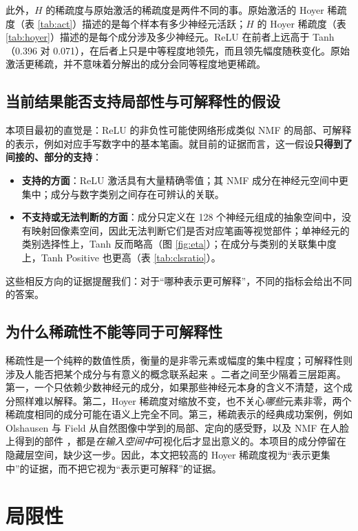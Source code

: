 \documentclass[UTF8,a4paper,11pt]{ctexart}
\begin{document}
此外，$H$ 的稀疏度与原始激活的稀疏度是两件不同的事。原始激活的 Hoyer 稀疏度（表 \ref{tab:act}）描述的是每个样本有多少神经元活跃；$H$ 的 Hoyer 稀疏度（表 \ref{tab:hoyer}）描述的是每个成分涉及多少神经元。ReLU 在前者上远高于 Tanh（0.396 对 0.071），在后者上只是中等程度地领先，而且领先幅度随秩变化。原始激活更稀疏，并不意味着分解出的成分会同等程度地更稀疏。

\subsection{当前结果能否支持局部性与可解释性的假设}

本项目最初的直觉是：ReLU 的非负性可能使网络形成类似 NMF 的局部、可解释的表示，例如对应手写数字中的基本笔画。就目前的证据而言，这一假设\textbf{只得到了间接的、部分的支持}：
\begin{itemize}
  \item \textbf{支持的方面}：ReLU 激活具有大量精确零值；其 NMF 成分在神经元空间中更集中；成分与数字类别之间存在可辨认的关联。
  \item \textbf{不支持或无法判断的方面}：成分只定义在 128 个神经元组成的抽象空间中，没有映射回像素空间，因此无法判断它们是否对应笔画等视觉部件；单神经元的类别选择性上，Tanh 反而略高（图 \ref{fig:eta}）；在成分与类别的关联集中度上，Tanh Positive 也更高（表 \ref{tab:clsratio}）。
\end{itemize}
这些相反方向的证据提醒我们：对于“哪种表示更可解释”，不同的指标会给出不同的答案。

\subsection{为什么稀疏性不能等同于可解释性}

稀疏性是一个纯粹的数值性质，衡量的是非零元素或幅度的集中程度；可解释性则涉及人能否把某个成分与有意义的概念联系起来 \cite{doshivelez2017towards}。二者之间至少隔着三层距离。第一，一个只依赖少数神经元的成分，如果那些神经元本身的含义不清楚，这个成分照样难以解释。第二，Hoyer 稀疏度对缩放不变，也不关心\emph{哪些}元素非零，两个稀疏度相同的成分可能在语义上完全不同。第三，稀疏表示的经典成功案例，例如 Olshausen 与 Field \cite{olshausen1996emergence} 从自然图像中学到的局部、定向的感受野，以及 NMF 在人脸上得到的部件 \cite{lee1999learning}，都是\emph{在输入空间中}可视化后才显出意义的。本项目的成分停留在隐藏层空间，缺少这一步。因此，本文把较高的 Hoyer 稀疏度视为“表示更集中”的证据，而不把它视为“表示更可解释”的证据。

\section{局限性}
\end{document}
